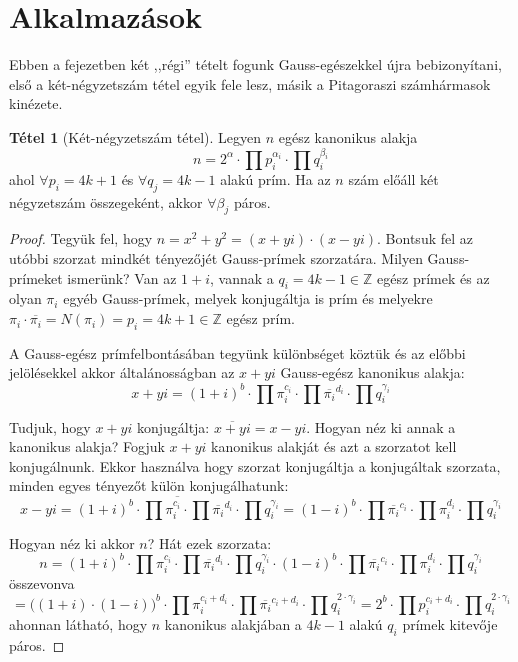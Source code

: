 \documentclass[12pt]{book}
\theoremstyle{plain} %
\theoremstyle{definition} %
\newtheorem{theo/}{Tétel}[section]
\newenvironment{theo}
  {\renewcommand{\qedsymbol}{$\clubsuit$}%
   \pushQED{\qed}\begin{theo/}}
  {\popQED\end{theo/}}
\theoremstyle{remark}
\renewcommand\qedsymbol{$\blacksquare$}
\numberwithin{equation}{section}  %
\def\Z{\mathbb{Z}}
\begin{document}
	\section{Alkalmazások}
	
	
	Ebben a fejezetben két ,,régi'' tételt fogunk Gauss-egészekkel újra bebizonyítani, első a két-négyzetszám tétel egyik fele lesz, másik a Pitagoraszi számhármasok kinézete.
	
	\begin{theo}[Két-négyzetszám tétel]
		Legyen $n$ egész kanonikus alakja
		\[  n = 2^{\alpha} \cdot \prod p_i^{\alpha_i} \cdot \prod q_i^{\beta_i} \]
		ahol $\forall p_i=4k+1$ és $\forall q_j = 4k-1$ alakú prím. Ha az $n$ szám előáll két négyzetszám összegeként, akkor $\forall \beta_j$ páros.
	\end{theo}

	\begin{proof}
		Tegyük fel, hogy $n=x^2+y^2=(x+yi)\cdot(x-yi)$. Bontsuk fel az utóbbi szorzat mindkét tényezőjét Gauss-prímek szorzatára. Milyen Gauss-prímeket ismerünk? Van az $1+i$, vannak a $q_i=4k-1\in \Z$ egész prímek és az olyan $\pi_i$ egyéb Gauss-prímek, melyek konjugáltja is prím és melyekre $\pi_i\cdot \overline{\pi_i} = N(\pi_i) = p_i = 4k+1\in \Z$ egész prím.
		
		A Gauss-egész prímfelbontásában tegyünk különbséget köztük és az előbbi jelölésekkel akkor általánosságban az $x+yi$ Gauss-egész kanonikus alakja:
		\[ x+yi = (1+i)^b\cdot \prod \pi_i^{c_i} \cdot \prod \overline{\pi_i}^{d_i}\cdot \prod q_i^{\gamma_i}  \]
		
		Tudjuk, hogy $x+yi$ konjugáltja: $\overline{x+yi}=x-yi$. Hogyan néz ki annak a kanonikus alakja? Fogjuk $x+yi$ kanonikus alakját és azt a szorzatot kell konjugálnunk. Ekkor használva hogy szorzat konjugáltja a konjugáltak szorzata, minden egyes tényezőt külön konjugálhatunk:
		\[ x-yi = \overline{(1+i)^b\cdot \prod \pi_i^{c_i} \cdot \prod \overline{\pi_i}^{d_i}\cdot \prod q_i^{\gamma_i}} = (1-i)^b\cdot \prod \overline{\pi_i}^{c_i} \cdot \prod \pi_i^{d_i}\cdot \prod q_i^{\gamma_i} \]
		
		Hogyan néz ki akkor $n$? Hát ezek szorzata:
		\[ n = (1+i)^b\cdot \prod \pi_i^{c_i} \cdot \prod \overline{\pi_i}^{d_i}\cdot \prod q_i^{\gamma_i} \cdot (1-i)^b\cdot \prod \overline{\pi_i}^{c_i} \cdot \prod \pi_i^{d_i}\cdot \prod q_i^{\gamma_i}   \]
		összevonva
		\[ = \big ((1+i)\cdot (1-i)\big )^{b} \cdot \prod \pi_i^{c_i+d_i} \cdot \prod \overline{\pi_i}^{c_i+d_i} \cdot \prod q_i^{2\cdot \gamma_i}  = 2^{b}\cdot \prod p_i^{c_i+d_i} \cdot \prod q_i^{2\cdot \gamma_i}  \]
		ahonnan látható, hogy $n$ kanonikus alakjában a $4k-1$ alakú $q_i$ prímek kitevője páros.
	\end{proof}
	
\end{document}
